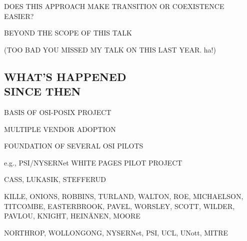 

\begin{bwslide}

\begin{nrtc}
\item	DOES THIS APPROACH MAKE TRANSITION OR COEXISTENCE EASIER?

\item	BEYOND THE SCOPE OF THIS TALK
    \begin{nrtc}
    \item	(TOO BAD YOU MISSED MY TALK ON THIS LAST YEAR.  ha!)
    \end{nrtc}
\end{nrtc}
\end{bwslide}


\begin{bwslide}
\part*	{WHAT'S HAPPENED\\ SINCE THEN}\bf

\begin{nrtc}
\item	BASIS OF OSI-POSIX PROJECT

\item	MULTIPLE VENDOR ADOPTION

\item	FOUNDATION OF SEVERAL OSI PILOTS
    \begin{nrtc}
    \item	e.g., PSI/NYSERNet WHITE PAGES PILOT PROJECT
    \end{nrtc}
\end{nrtc}
\end{bwslide}


\begin{bwslide}

\begin{nrtc}
\item	CASS, LUKASIK, STEFFERUD

\item	KILLE, ONIONS, ROBBINS, TURLAND, WALTON, ROE, MICHAELSON, TITCOMBE,
	EASTERBROOK, PAVEL, WORSLEY, SCOTT, WILDER, PAVLOU, KNIGHT,
	HEIN\"{A}NEN, MOORE

\item	NORTHROP, WOLLONGONG, NYSERNet, PSI, UCL, UNott, MITRE
\end{nrtc}
\end{bwslide}


